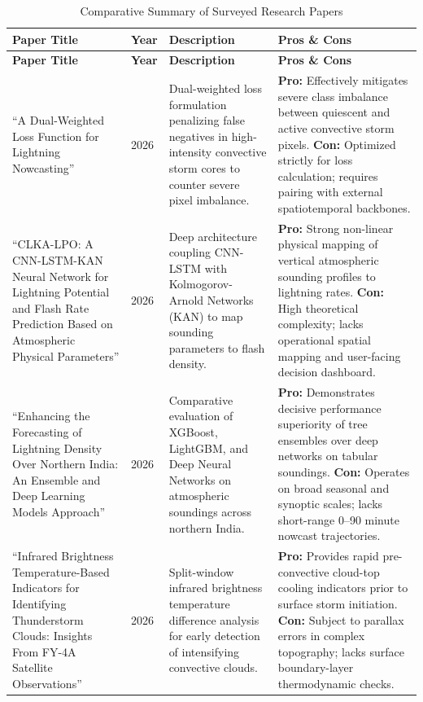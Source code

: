 \documentclass[12pt,a4paper]{report}
\newcommand{\hdrrow}{\rowcolor{gray!20}}
\begin{document}
\begingroup
{}
\sloppy
\begin{xltabular}{\textwidth}{|L{3.8cm}|C{1.3cm}|L{4.3cm}|Y|}
\caption{Comparative Summary of Surveyed Research Papers}\label{tab:lit_comparison} \\
\hline
\hdrrow \textbf{Paper Title} & \textbf{Year} & \textbf{Description} & \textbf{Pros \& Cons} \\ \hline
\endfirsthead
\hline
\hdrrow \textbf{Paper Title} & \textbf{Year} & \textbf{Description} & \textbf{Pros \& Cons} \\ \hline
\endhead
\hline
\endfoot
\hline
\endlastfoot

``A Dual-Weighted Loss Function for Lightning Nowcasting'' \cite{tian2026dual} & 2026 & Dual-weighted loss formulation penalizing false negatives in high-intensity convective storm cores to counter severe pixel imbalance. & \textbf{Pro:} Effectively mitigates severe class imbalance between quiescent and active convective storm pixels. \newline \textbf{Con:} Optimized strictly for loss calculation; requires pairing with external spatiotemporal backbones. \\ \hline
``CLKA-LPO: A CNN-LSTM-KAN Neural Network for Lightning Potential and Flash Rate Prediction Based on Atmospheric Physical Parameters'' \cite{chen2026clka} & 2026 & Deep architecture coupling CNN-LSTM with Kolmogorov-Arnold Networks (KAN) to map sounding parameters to flash density. & \textbf{Pro:} Strong non-linear physical mapping of vertical atmospheric sounding profiles to lightning rates. \newline \textbf{Con:} High theoretical complexity; lacks operational spatial mapping and user-facing decision dashboard. \\ \hline
``Enhancing the Forecasting of Lightning Density Over Northern India: An Ensemble and Deep Learning Models Approach'' \cite{kumar2026enhancing} & 2026 & Comparative evaluation of XGBoost, LightGBM, and Deep Neural Networks on atmospheric soundings across northern India. & \textbf{Pro:} Demonstrates decisive performance superiority of tree ensembles over deep networks on tabular soundings. \newline \textbf{Con:} Operates on broad seasonal and synoptic scales; lacks short-range 0--90 minute nowcast trajectories. \\ \hline
``Infrared Brightness Temperature-Based Indicators for Identifying Thunderstorm Clouds: Insights From FY-4A Satellite Observations'' \cite{wang2026infrared} & 2026 & Split-window infrared brightness temperature difference analysis for early detection of intensifying convective clouds. & \textbf{Pro:} Provides rapid pre-convective cloud-top cooling indicators prior to surface storm initiation. \newline \textbf{Con:} Subject to parallax errors in complex topography; lacks surface boundary-layer thermodynamic checks. \\ \hline

\end{xltabular}
\end{document}
